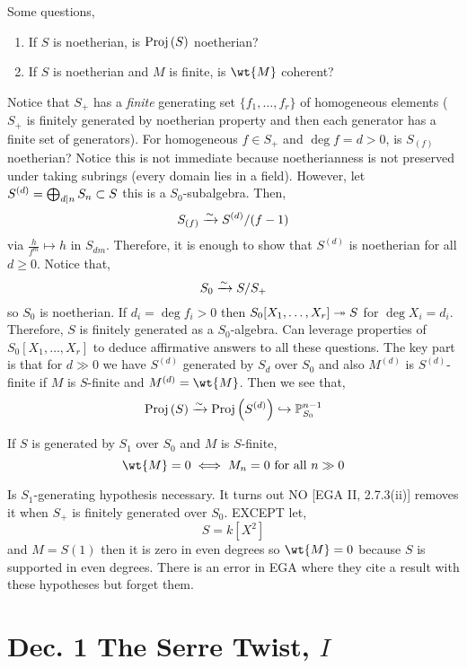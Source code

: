 \documentclass[12pt]{article}
\begin{document}
\begin{rmk}
Some questions,
\begin{enumerate}
\item If $S$ is noetherian, is $\mathrm{Proj}\left( S \right)$ noetherian?
\item If $S$ is noetherian and $M$ is finite, is $\wt{M}$ coherent?
\end{enumerate}
Notice that $S_+$ has a \textit{finite} generating set $\{f_1, \dots, f_r \}$ of homogeneous elements ($S_+$ is finitely generated by noetherian property and then each generator has a finite set of generators). For homogeneous $f \in S_+$ and $\deg{f} = d > 0$, is $S_{(f)}$ noetherian? Notice this is not immediate because noetherianness is not preserved under taking subrings (every domain lies in a field). However, let $S^{(d)} = \bigoplus_{d \mid n} S_n \subset S$ this is a $S_0$-subalgebra. Then,
\[ S_{(f)} \xrightarrow{\sim} S^{(d)}/(f-1) \]
via $\frac{h}{f^m} \mapsto h$ in $S_{dm}$. Therefore, it is enough to show that $S^{(d)}$ is noetherian for all $d \ge 0$. Notice that,
\[ S_0 \xrightarrow{\sim} S / S_+ \]
so $S_0$ is noetherian. If $d_i = \deg{f_i} > 0$ then $S_0[X_1, \dots, X_r] \twoheadrightarrow S$ for $\deg{X_i} = d_i$. Therefore, $S$ is finitely generated as a $S_0$-algebra. Can leverage properties of $S_0[X_1, \dots, X_r]$ to deduce affirmative answers to all these questions. The key part is that for $d \gg 0$ we have $S^{(d)}$ generated by $S_d$ over $S_0$ and also $M^{(d)}$ is $S^{(d)}$-finite if $M$ is $S$-finite and $M^{(d)} = \wt{M}$. Then we see that,
\[ \mathrm{Proj}\left( S \right) \xrightarrow{\sim} \mathrm{Proj}\left( S^{(d)} \right) \hookrightarrow \mathbb{P}^{n-1}_{S_0} \]
\end{rmk}

\begin{prop}
If $S$ is generated by $S_1$ over $S_0$ and $M$ is $S$-finite,
\[ \wt{M} = 0 \iff M_n = 0 \text{ for all } n \gg 0 \]
\end{prop}

\begin{rmk}
Is $S_1$-generating hypothesis necessary. It turns out NO [EGA II, 2.7.3(ii)] removes it when $S_+$ is finitely generated over $S_0$. EXCEPT let,
\[ S = k[X^2] \]
and $M = S(1)$ then it is zero in even degrees so $\wt{M} = 0$ because $S$ is supported in even degrees. There is an error in EGA where they cite a result with these hypotheses but forget them.
\end{rmk}

\section{Dec. 1 The Serre Twist, $I$}
\end{document}

